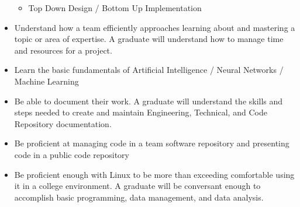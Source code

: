 \begin{itemize}
\begin{itemize}
\item Top Down Design / Bottom Up Implementation
\end{itemize}
\item Understand how a team efficiently approaches learning about and mastering a topic or area of expertise. A graduate will understand how to manage time and resources for a project.
\item Learn the basic fundamentals of Artificial Intelligence / Neural Networks / Machine Learning
\item Be able to document their work. A graduate will understand the skills and steps needed to create and maintain Engineering, Technical, and Code Repository documentation.
\item Be proficient at managing code in a team software repository and presenting code in a public code repository
\item Be proficient enough with Linux to be more than exceeding comfortable using it in a college environment. A graduate will be conversant enough to accomplish basic programming, data management, and data analysis.

\end{itemize}